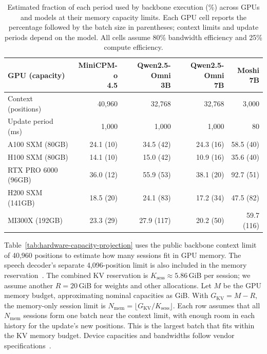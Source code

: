 \begin{table}[t]
  \centering
  \caption{Estimated fraction of each period used by backbone execution (\%) across GPUs and models at their memory capacity limits.
  Each GPU cell reports the percentage followed by the batch size in parentheses; context limits and update periods depend on the model.
  All cells assume 80\% bandwidth efficiency and 25\% compute efficiency.}
  \label{tab:cross-model-cycle-usage}
  \begin{tabular}{lrrrr}
    \toprule
    GPU (capacity) & \shortstack{MiniCPM-o\\4.5} & \shortstack{Qwen2.5-Omni\\3B} & \shortstack{Qwen2.5-Omni\\7B} & \shortstack{Moshi\\7B} \\
    \midrule
    Context (positions) & 40,960 & 32,768 & 32,768 & 3,000 \\
    Update period (ms) & 1,000 & 1,000 & 1,000 & 80 \\
    \midrule
    A100 SXM (80GB) & 24.1 (10) & 34.5 (42) & 24.3 (16) & 58.5 (40) \\
    H100 SXM (80GB) & 14.1 (10) & 15.0 (42) & 10.9 (16) & 35.6 (40) \\
    RTX PRO 6000 (96GB) & 36.0 (12) & 55.9 (53) & 38.1 (20) & 92.7 (51) \\
    H200 SXM (141GB) & 18.5 (20) & 24.1 (83) & 17.2 (34) & 47.5 (82) \\
    MI300X (192GB) & 23.3 (29) & 27.9 (117) & 20.2 (50) & 59.7 (116) \\
    \bottomrule
  \end{tabular}
\end{table}

Table~\ref{tab:hardware-capacity-projection} uses the public backbone context limit of 40,960 positions to estimate how many sessions fit in GPU memory.
The speech decoder's separate 4,096-position limit is also included in the memory reservation~\cite{openbmb2026minicpmconfig}.
The combined KV reservation is $K_{\mathrm{sess}}\approx5.86$\,GiB per session; we assume another $R=20$\,GiB for weights and other allocations.
Let $M$ be the GPU memory budget, approximating nominal capacities as GiB.
With $G_{\mathrm{KV}}=M-R$, the memory-only session limit is $N_{\mathrm{mem}}=\lfloor G_{\mathrm{KV}}/K_{\mathrm{sess}}\rfloor$.
Each row assumes that all $N_{\mathrm{mem}}$ sessions form one batch near the context limit, with enough room in each history for the update's new positions.
This is the largest batch that fits within the KV memory budget.
Device capacities and bandwidths follow vendor specifications~\cite{nvidia2021a100,nvidia2023h100,nvidia2026rtxpro,nvidia2026h200,amd2025mi300x}.

